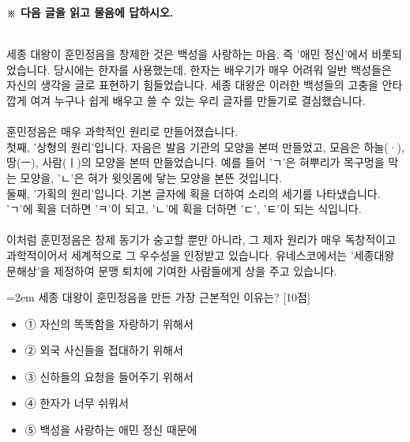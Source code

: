 \documentclass[12pt,a4paper]{article}
\newcommand{\qnum}[1]{%
  \tikz[baseline=(num.base)]{%
    \node[circle, fill=numCircle, text=white, inner sep=0pt,
          minimum size=18pt, font=\small\bfseries] (num) {#1};%
  }%
}
\newcommand{\pts}[1]{%
  \hfill\textcolor{ptsBadge}{[#1점]}%
}
\begin{document}
\vspace{4mm}
{\small\textbf{※ 다음 글을 읽고 물음에 답하시오.}}
\vspace{2mm}
\begin{tcolorbox}[passage]
[지문] \\{}
세종 대왕이 훈민정음을 창제한 것은 백성을 사랑하는 마음, 즉 '애민 정신'에서 비롯되었습니다. 당시에는 한자를 사용했는데, 한자는 배우기가 매우 어려워 일반 백성들은 자신의 생각을 글로 표현하기 힘들었습니다. 세종 대왕은 이러한 백성들의 고충을 안타깝게 여겨 누구나 쉽게 배우고 쓸 수 있는 우리 글자를 만들기로 결심했습니다. \\{}
\vspace{4pt} \\{}
훈민정음은 매우 과학적인 원리로 만들어졌습니다. \\{}
첫째, '상형의 원리'입니다. 자음은 발음 기관의 모양을 본떠 만들었고, 모음은 하늘(·), 땅(ㅡ), 사람(ㅣ)의 모양을 본떠 만들었습니다. 예를 들어 'ㄱ'은 혀뿌리가 목구멍을 막는 모양을, 'ㄴ'은 혀가 윗잇몸에 닿는 모양을 본뜬 것입니다. \\{}
둘째, '가획의 원리'입니다. 기본 글자에 획을 더하여 소리의 세기를 나타냈습니다. 'ㄱ'에 획을 더하면 'ㅋ'이 되고, 'ㄴ'에 획을 더하면 'ㄷ', 'ㅌ'이 되는 식입니다. \\{}
\vspace{4pt} \\{}
이처럼 훈민정음은 창제 동기가 숭고할 뿐만 아니라, 그 제자 원리가 매우 독창적이고 과학적이어서 세계적으로 그 우수성을 인정받고 있습니다. 유네스코에서는 '세종대왕 문해상'을 제정하여 문맹 퇴치에 기여한 사람들에게 상을 주고 있습니다.
\end{tcolorbox}
\vspace{3mm}
\begin{minipage}{\columnwidth}
{\hangindent=2em
\qnum{41}\enspace 세종 대왕이 훈민정음을 만든 가장 근본적인 이유는? \pts{10}
\par}

\vspace{3mm}
\begin{itemize}[leftmargin=2.5em, labelsep=0.3em, label={}, itemsep=4pt, parsep=1pt, topsep=0pt]
  \item ① 자신의 똑똑함을 자랑하기 위해서
  \item ② 외국 사신들을 접대하기 위해서
  \item ③ 신하들의 요청을 들어주기 위해서
  \item ④ 한자가 너무 쉬워서
  \item ⑤ 백성을 사랑하는 애민 정신 때문에
\end{itemize}
\end{minipage}
\vspace{4mm}
\end{document}

